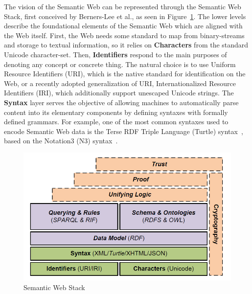 The vision of the Semantic Web can be represented through the Semantic Web Stack, first 
conceived by Berners-Lee et al., as seen in Figure~\ref{fig:semanticWebStack}. The lower levels describe the 
foundational elements of the Semantic Web which are aligned with the Web itself. First, 
the Web needs some standard to map from binary-streams and storage to textual information, 
so it relies on \textbf{Characters} from the standard Unicode character-set. Then, \textbf{Identifiers} 
respond to the main purposes of denoting any concept or concrete thing. The natural choice is to 
use Uniform Resource Identifiers (URI), which is the native standard for identification on 
the Web, or a recently adopted generalization of URI, Internationalized Resource 
Identifiers (IRI), which additionally support unescaped Unicode strings. The \textbf{Syntax} layer 
serves the objective of allowing machines to automatically parse content into its elementary 
components by defining syntaxes with formally defined grammars. For example, one of the most 
common syntaxes used to encode Semantic Web data is the Terse RDF Triple Language (Turtle) 
syntax~\cite{key:turtle}, based on the Notation3 (N3) syntax~\cite{key:n3}.

\begin{figure}[!h]
    \centering
    \includegraphics[scale=.65]{imagenes/2_theorical_framework/semanticWebStack.png}
    \caption{Semantic Web Stack~\cite{key:linked14-Hogan}}
    \label{fig:semanticWebStack}
\end{figure}


